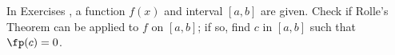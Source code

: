{\noindent In Exercises}
{, a function $f(x)$ and interval $[a,b]$ are given. Check if Rolle's Theorem can be applied to $f$ on $[a,b]$; if so, find $c$ in $[a,b]$ such that $\fp(c)=0$.}
